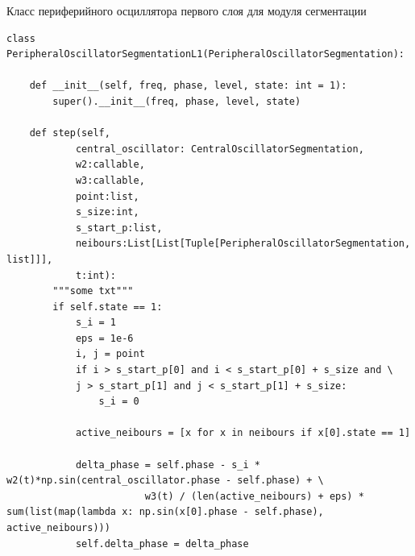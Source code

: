 \documentclass[14pt, russian]{scrartcl}
\begin{document}
\begin{listing}[H]
    \caption{Класс периферийного осциллятора первого слоя для модуля сегментации}
    \label{lst:contour_extr_sobel}
    \begin{verbatim}
class PeripheralOscillatorSegmentationL1(PeripheralOscillatorSegmentation):

    def __init__(self, freq, phase, level, state: int = 1):
        super().__init__(freq, phase, level, state)

    def step(self, 
            central_oscillator: CentralOscillatorSegmentation, 
            w2:callable, 
            w3:callable, 
            point:list, 
            s_size:int, 
            s_start_p:list,
            neibours:List[List[Tuple[PeripheralOscillatorSegmentation, list]]],
            t:int):
        """some txt"""
        if self.state == 1:
            s_i = 1
            eps = 1e-6
            i, j = point
            if i > s_start_p[0] and i < s_start_p[0] + s_size and \
            j > s_start_p[1] and j < s_start_p[1] + s_size:
                s_i = 0
            
            active_neibours = [x for x in neibours if x[0].state == 1]
            
            delta_phase = self.phase - s_i * w2(t)*np.sin(central_oscillator.phase - self.phase) + \
                        w3(t) / (len(active_neibours) + eps) * sum(list(map(lambda x: np.sin(x[0].phase - self.phase), active_neibours)))
            self.delta_phase = delta_phase   
    \end{verbatim}
\end{listing}
\end{document}
